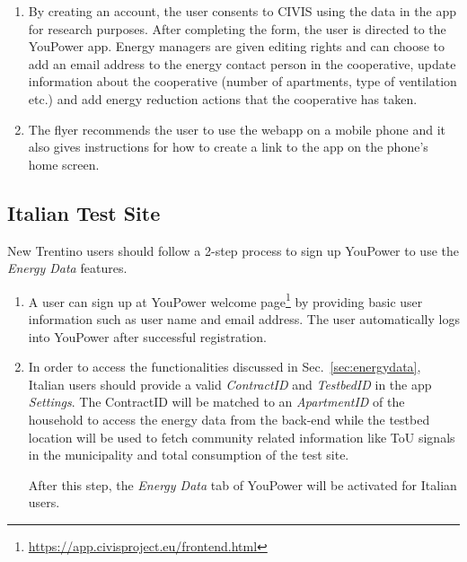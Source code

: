 \begin{enumerate}
\item By creating an account, the user consents to CIVIS using the data in the app for research purposes. After completing the form, the user is directed to the YouPower app. Energy managers are given editing rights and can choose to add an email address to the energy contact person in the cooperative, update information about the cooperative (number of apartments, type of ventilation etc.) and add energy reduction actions that the cooperative has taken.

\item The flyer recommends the user to use the webapp on a mobile phone and it also gives instructions for how to create a link to the app on the phone's home screen.

\end{enumerate}

\subsection{Italian Test Site}

New Trentino users should follow a 2-step process to sign up YouPower to use the \textit{Energy Data} features.

\begin{enumerate}

\item A user can sign up at YouPower welcome page\footnote{\url{https://app.civisproject.eu/frontend.html}} by providing basic user information such as user name and email address. The user automatically logs into YouPower after successful registration.

\item In order to access the functionalities discussed in Sec.~\ref{sec:energydata}, Italian users should provide a valid \textit{ContractID} and \textit{TestbedID} in the app \textit{Settings}. The ContractID will be matched to an \textit{ApartmentID} of the household to access the energy data from the back-end while the testbed location will be used to fetch community related information like ToU signals in the municipality and total consumption of the test site. 

After this step, the \textit{Energy Data} tab of YouPower will be activated for Italian users.
\end{enumerate}